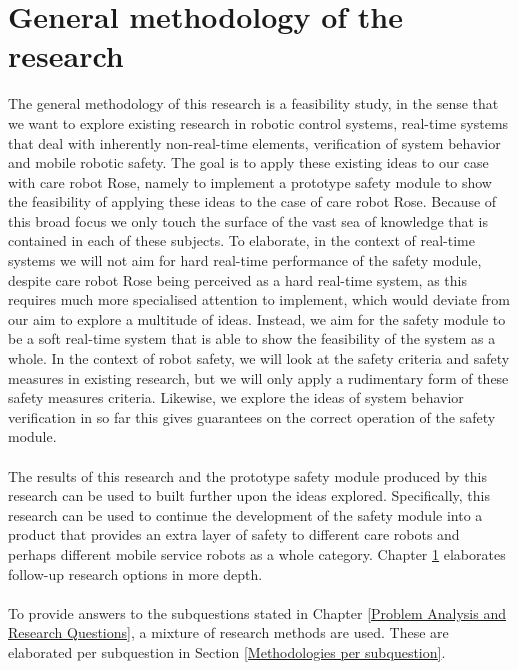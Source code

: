 \documentclass[12pt]{scrreprt}
\begin{document}
\section{General methodology of the research}
The general methodology of this research is a feasibility study, in the sense that we want to explore existing research in robotic control systems, real-time systems that deal with inherently non-real-time elements, verification of system behavior and mobile robotic safety. The goal is to apply these existing ideas to our case with care robot Rose, namely to implement a prototype safety module to show the feasibility of applying these ideas to the case of care robot Rose. Because of this broad focus we only touch the surface of the vast sea of knowledge that is contained in each of these subjects. To elaborate, in the context of real-time systems we will not aim for hard real-time performance of the safety module, despite care robot Rose being perceived as a hard real-time system, as this requires much more specialised attention to implement, which would deviate from our aim to explore a multitude of ideas. Instead, we aim for the safety module to be a soft real-time system that is able to show the feasibility of the system as a whole. In the context of robot safety, we will look at the safety criteria and safety measures in existing research, but we will only apply a rudimentary form of these safety measures criteria. Likewise, we explore the ideas of system behavior verification in so far this gives guarantees on the correct operation of the safety module.
\\\\
The results of this research and the prototype safety module produced by this research can be used to built further upon the ideas explored. Specifically, this research can be used to continue the development of the safety module into a product that provides an extra layer of safety to different care robots and perhaps different mobile service robots as a whole category. Chapter \ref{} elaborates follow-up research options in more depth. 
\\\\
To provide answers to the subquestions stated in Chapter \ref{Problem Analysis and Research Questions}, a mixture of research methods are used. These are elaborated per subquestion in Section \ref{Methodologies per subquestion}.
\end{document}
